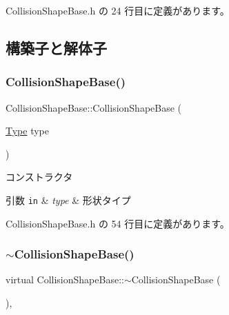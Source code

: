  Collision\+Shape\+Base.\+h の 24 行目に定義があります。



\subsection{構築子と解体子}
\mbox{\label{class_collision_shape_base_a9dd2ab42e2a6e96c6bff832ce8ca62b9}} 
\subsubsection{\texorpdfstring{Collision\+Shape\+Base()}{CollisionShapeBase()}}
{\footnotesize\ttfamily Collision\+Shape\+Base\+::\+Collision\+Shape\+Base (\begin{DoxyParamCaption}\item[{\mbox{\hyperlink{class_collision_shape_base_a8abcef092855ad0ca191047044b002cb}{Type}}}]{type }\end{DoxyParamCaption})\hspace{0.3cm}{\ttfamily [inline]}}



コンストラクタ 


\begin{DoxyParams}[1]{引数}
\mbox{\tt in}  & {\em type} & 形状タイプ \\
\hline
\end{DoxyParams}


 Collision\+Shape\+Base.\+h の 54 行目に定義があります。

\mbox{\label{class_collision_shape_base_a64fa9e1ae6b582be42360e926ce5d6cb}} 
\subsubsection{\texorpdfstring{$\sim$\+Collision\+Shape\+Base()}{~CollisionShapeBase()}}
{\footnotesize\ttfamily virtual Collision\+Shape\+Base\+::$\sim$\+Collision\+Shape\+Base (\begin{DoxyParamCaption}{ }\end{DoxyParamCaption})\hspace{0.3cm}{\ttfamily [inline]}, {\ttfamily [virtual]}}



